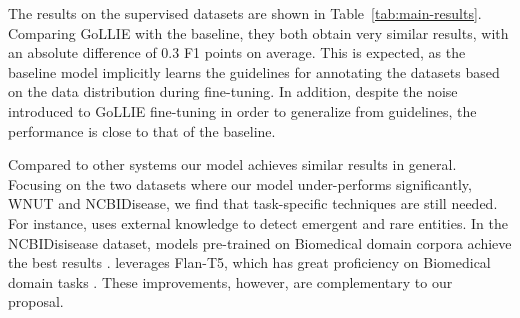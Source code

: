 The results on the supervised datasets are shown in Table~\ref{tab:main-results}. Comparing GoLLIE with the baseline, they both obtain very similar results, with an absolute difference of 0.3 F1 points on average. This is expected, as the baseline model implicitly learns the guidelines for annotating the datasets based on the data distribution during fine-tuning. In addition, despite the noise introduced to GoLLIE fine-tuning in order to generalize from guidelines, the performance is close to that of the baseline.

Compared to other systems our model achieves similar results in general. Focusing on the two datasets where our model under-performs significantly, WNUT and NCBIDisease, we find that task-specific techniques are still needed. For instance,  \cite{wang-etal-2021-improving} uses external knowledge to detect emergent and rare entities. In the NCBIDisisease dataset, models pre-trained on Biomedical domain corpora achieve the best results \citep{10.1007/978-3-030-68763-2_48}. \citep{DBLP:journals/corr/abs-2304-08085} leverages Flan-T5, which has great proficiency on Biomedical domain tasks \citep{DBLP:journals/corr/abs-2212-13138}.  These improvements, however, are complementary to our proposal.  

